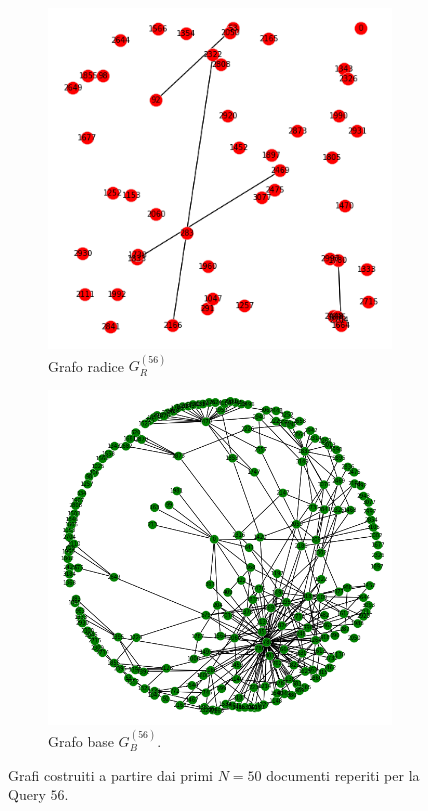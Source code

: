 \begin{figure}[H]
	\centering
	\begin{subfigure}{.5\textwidth}
		\centering
		\includegraphics[width=1\textwidth]{figures/R.png}
		\caption{Grafo radice $G_R^{(56)}$}
		\label{fig:uno}
	\end{subfigure}%
	\begin{subfigure}{.5\textwidth}
		\centering
		\includegraphics[width=1\textwidth]{figures/B.png}
		\caption{Grafo base $G_B^{(56)}$.}
		\label{fig:due}
	\end{subfigure}
	\caption{Grafi costruiti a partire dai primi $N=50$ documenti reperiti per la Query $56$.}
	\label{fig:hitsexpansion}
\end{figure}

